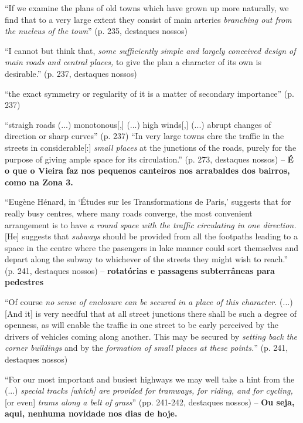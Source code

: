 \documentclass[12pt, a4paper]{book} %
\begin{document}
        ``If we examine the plans of old towns which have grown up more naturally, we find that to a very large extent they consist of main arteries \textit{branching out from the nucleus of the town}'' (p. 235, destaques nossos)

        ``I cannot but think that, \textit{some sufficiently simple and largely conceived design of main roads and central places,} to give the plan a character of its own is desirable.'' (p. 237, destaques nossos)

        ``the exact symmetry or regularity of it is a matter of secondary importance'' (p. 237)

        ``straigh roads (...) monotonous[,] (...) high winds[,] (...) abrupt changes of direction or sharp curves'' (p. 237)
        ``In very large towns ehre the traffic in the streets in considerable[:] \textit{small places} at the junctions of the roads, purely for the purpose of giving ample space for its circulation.'' (p. 273, destaques nossos) – \textbf{É o que o Vieira faz nos pequenos canteiros nos arrabaldes dos bairros, como na Zona 3.}

        ``Eugène Hénard, in `Études sur les Transformations de Paris,' suggests that for really busy centres, where many roads converge, the most convenient arrangement is to have \textit{a round space with the traffic circulating in one direction.} [He] suggests that \textit{subways} should be provided from all the footpaths leading to a space in the centre where the pasengers in lake manner could sort themselves and depart along the subway to whichever of the streets they might wish to reach.'' (p. 241, destaques nossos) – \textbf{rotatórias e passagens subterrâneas para pedestres}

        ``Of course \textit{no sense of enclosure can be secured in a \textit{place} of this character.} (...) [And it] is very needful that at all street junctions there shall be such a degree of openness, as will enable the traffic in one street to be early perceived by the drivers of vehicles coming along another. This may be secured by \textit{setting back the corner buildings} and by the \textit{formation of small places at these points.}'' (p. 241, destaques nossos)

        ``For our most important and busiest highways we may well take a hint from the (...) \textit{special tracks [which] are provided for tramways, for riding, and for cycling,} [or even] \textit{trams along a belt of grass}'' (pp. 241-242, destaques nossos) – \textbf{Ou seja, aqui, nenhuma novidade nos dias de hoje.}
\end{document}
